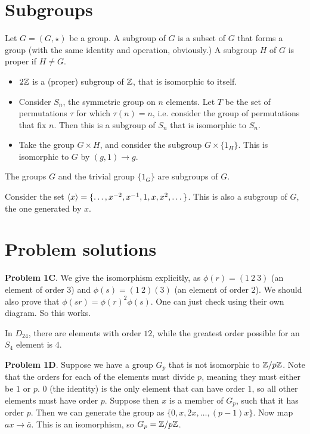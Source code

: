 \documentclass[11pt]{scrreport}
\begin{document}
\section{Subgroups}
\begin{definition}
    Let $G=(G,\star)$ be a group. A subgroup of $G$ is a subset of $G$ that forms a group (with the same identity and operation, obviously.) A subgroup $H$ of $G$ is proper if $H\neq G$.
\end{definition}
\begin{example}
    \begin{itemize}
        \item $2\mathbb Z$ is a (proper) subgroup of $\mathbb Z$, that is isomorphic to itself.
        \item Consider $S_n$, the symmetric group on $n$ elements. Let $T$ be the set of permutations $\tau$ for which $\tau(n)=n$, i.e. consider the group of permutations that fix $n$. Then this is a subgroup of $S_n$ that is isomorphic to $S_n$.
        \item Take the group $G\times H$, and consider the subgroup $G\times\{1_H\}$. This is isomorphic to $G$ by $(g,1)\to g$.
    \end{itemize}
\end{example}
\begin{example}
    The groups $G$ and the trivial group $\{1_G\}$ are subgroups of $G$.
\end{example}
\begin{example}
    Consider the set $\left<x\right> = \{\dots, x^{-2},x^{-1}, 1, x, x^2, \dots\}$. This is also a subgroup of $G$, the one generated by $x$.
\end{example}
\section{Problem solutions}
\textbf{Problem 1C}. We give the isomorphism explicitly, as $\phi(r)=(1 \ 2 \ 3)$ (an element of order $3$) and $\phi(s) = (1 \ 2)(3)$ (an element of order $2$). We should also prove that $\phi(sr)=\phi(r)^{2}\phi(s)$. One can just check using their own diagram. So this works.

In $D_{24}$, there are elements with order $12$, while the greatest order possible for an $S_4$ element is $4$.

\textbf{Problem 1D}. Suppose we have a group $G_p$ that is not isomorphic to $\mathbb Z/p\mathbb Z$. Note that the orders for each of the elements must divide $p$, meaning they must either be $1$ or $p$. $0$ (the identity) is the only element that can have order $1$, so all other elements must have order $p$. Suppose then $x$ is a member of $G_p$, such that it has order $p$. Then we can generate the group as $\{0,x,2x,\dots,(p-1)x\}$. Now map $ax \to \bar a$. This is an isomorphism, so $G_p = \mathbb Z/p\mathbb Z$.
\end{document}
